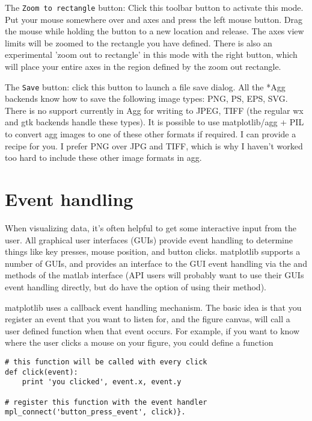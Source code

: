 \documentclass[twoside]{book}
\begin{document}
The \texttt{Zoom to rectangle} button: Click this toolbar button to
activate this mode.  Put your mouse somewhere over and axes and press
the left mouse button.  Drag the mouse while holding the button to a
new location and release.  The axes view limits will be zoomed to the
rectangle you have defined.  There is also an experimental 'zoom out
to rectangle' in this mode with the right button, which will place
your entire axes in the region defined by the zoom out rectangle.

The \texttt{Save} button: click this button to launch a file save
dialog.  All the *Agg backends know how to save the following image
types: PNG, PS, EPS, SVG.  There is no support currently in Agg for
writing to JPEG, TIFF (the regular wx and gtk backends handle these
types).  It is possible to use matplotlib/agg + PIL to convert agg
images to one of these other formats if required.  I can provide a
recipe for you.  I prefer PNG over JPG and TIFF, which is why I
haven't worked too hard to include these other image formats in agg.



\section{Event handling}
\label{sec:events}

When visualizing data, it's often helpful to get some interactive
input from the user.  All graphical user interfaces (GUIs) provide
event handling to determine things like key presses, mouse position,
and button clicks.  matplotlib supports a number of GUIs, and provides
an interface to the GUI event handling via the  and
 methods of the matlab interface (API users will
probably want to use their GUIs event handling directly, but do have
the option of using their  method).

matplotlib uses a callback event handling mechanism.  The basic idea
is that you register an event that you want to listen for, and the
figure canvas, will call a user defined function when that event
occurs.  For example, if you want to know where the user clicks a
mouse on your figure, you could define a function

\begin{lstlisting}
# this function will be called with every click
def click(event):
    print 'you clicked', event.x, event.y

# register this function with the event handler
mpl_connect('button_press_event', click)}.  
\end{lstlisting}
\end{document}
